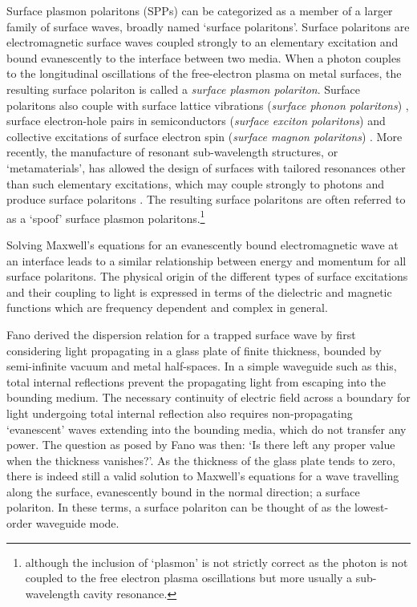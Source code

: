 Surface plasmon polaritons (SPPs)  can be categorized as a member of a larger family of surface waves, broadly named `surface polaritons'. Surface polaritons are electromagnetic surface waves coupled strongly to an elementary excitation and bound evanescently to the interface between two media. When a photon couples to the longitudinal oscillations of the free-electron plasma on metal surfaces, the resulting surface polariton is called a \textit{surface plasmon polariton}. Surface polaritons also couple with surface lattice vibrations (\textit{surface phonon polaritons}) \cite{Huang1951}, surface electron-hole pairs in semiconductors (\textit{surface exciton polaritons}) \cite{Lagois1976} and collective excitations of surface electron spin (\textit{surface magnon polaritons}) \cite{Elmzughi1995}. More recently, the manufacture of resonant sub-wavelength structures, or `metamaterials', has allowed the design of surfaces with tailored resonances other than such elementary excitations, which may couple strongly to photons and produce surface polaritons \cite{Pendry2004, Hibbins2005}. The resulting surface polaritons are often referred to as a `spoof' surface plasmon polaritons.\footnote{although the inclusion of `plasmon' is not strictly correct as the photon is not coupled to the free electron plasma oscillations but more usually a sub-wavelength cavity resonance.}

Solving Maxwell's equations for an evanescently bound electromagnetic wave at an interface leads to a similar relationship between energy and momentum for all surface polaritons. The physical origin of  the different types of surface excitations and their coupling to light is expressed in terms of the dielectric and magnetic functions which are frequency dependent and complex in general.

Fano \cite{Fano1941} derived the dispersion relation for a trapped surface wave by first considering light propagating in a glass plate of finite thickness, bounded by semi-infinite vacuum and metal half-spaces.  In a simple waveguide such as this, total internal reflections prevent the propagating light from escaping into the bounding medium. The necessary continuity of electric field across a boundary for light undergoing total internal reflection also requires non-propagating `evanescent' waves extending into the bounding media, which do not  transfer any power. The question as posed by Fano \cite{Fano1941} was then: `Is there left any proper value when the thickness vanishes?'. As the thickness of the glass plate tends to zero, there is indeed still a valid solution to Maxwell's equations for a wave travelling along the surface, evanescently bound in the normal direction; a surface polariton. In these terms, a surface polariton can be thought of as the lowest-order waveguide mode.

